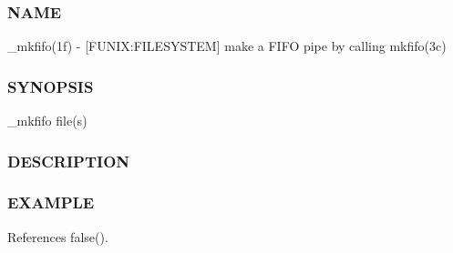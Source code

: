 \subsubsection*{N\+A\+ME}

\+\_\+mkfifo(1f) -\/ \mbox{[}F\+U\+N\+IX\+:F\+I\+L\+E\+S\+Y\+S\+T\+EM\mbox{]} make a F\+I\+FO pipe by calling mkfifo(3c) \subsubsection*{S\+Y\+N\+O\+P\+S\+IS}

\+\_\+mkfifo file(s) \subsubsection*{D\+E\+S\+C\+R\+I\+P\+T\+I\+ON}

\subsubsection*{E\+X\+A\+M\+P\+LE}

References false().

